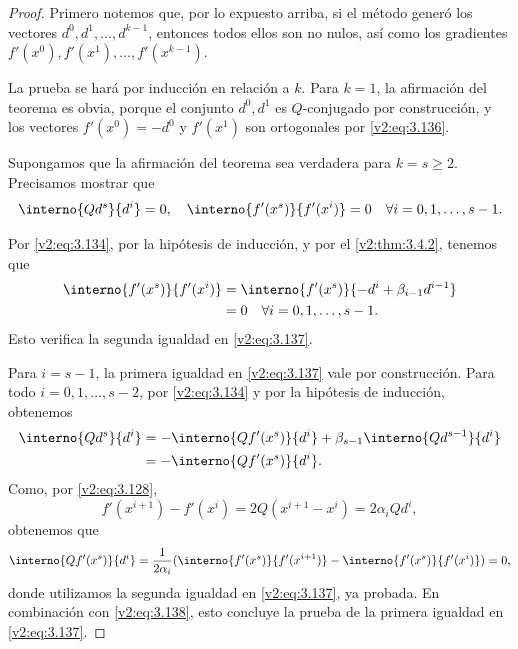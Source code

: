 \begin{proof}
    Primero notemos que, por lo expuesto arriba, si el método generó los vectores $d^0, d^1, \dots, d^{k-1}$, entonces todos ellos son no nulos, así como los gradientes $f'(x^0), f'(x^1), \dots, f'(x^{k-1})$.
    
    La prueba se hará por inducción en relación a $k$. Para $k=1$, la afirmación del teorema es obvia, porque el conjunto $d^0, d^1$ es $Q$-conjugado por construcción, y los vectores $f'(x^0) = -d^0$ y $f'(x^1)$ son ortogonales por \eqref{v2:eq:3.136}.
    
    Supongamos que la afirmación del teorema sea verdadera para $k = s \ge 2$. Precisamos mostrar que
    \begin{equation}
        \interno{Qd^s}{d^i} = 0, \quad \interno{f'(x^s)}{f'(x^i)} = 0 \quad \forall i = 0, 1, \dots, s-1.
        \label{v2:eq:3.137}
    \end{equation}
    
    Por \eqref{v2:eq:3.134}, por la hipótesis de inducción, y por el \cref{v2:thm:3.4.2}, tenemos que
    \begin{align*}
        \interno{f'(x^s)}{f'(x^i)} &= \interno{f'(x^s)}{-d^i + \beta_{i-1}d^{i-1}} \\
        &= 0 \quad \forall i = 0, 1, \dots, s-1.
    \end{align*}
    Esto verifica la segunda igualdad en \eqref{v2:eq:3.137}.
    
    Para $i = s-1$, la primera igualdad en \eqref{v2:eq:3.137} vale por construcción. Para todo $i = 0, 1, \dots, s-2$, por \eqref{v2:eq:3.134} y por la hipótesis de inducción, obtenemos
    \begin{align}
        \interno{Qd^s}{d^i} &= -\interno{Qf'(x^s)}{d^i} + \beta_{s-1}\interno{Qd^{s-1}}{d^i} \nonumber \\
        &= -\interno{Qf'(x^s)}{d^i}. \label{v2:eq:3.138}
    \end{align}
    Como, por \eqref{v2:eq:3.128},
    \[
        f'(x^{i+1}) - f'(x^i) = 2Q(x^{i+1} - x^i) = 2\alpha_i Qd^i,
    \]
    obtenemos que
    \[
        \interno{Qf'(x^s)}{d^i} = \frac{1}{2\alpha_i}(\interno{f'(x^s)}{f'(x^{i+1})} - \interno{f'(x^s)}{f'(x^i)}) = 0,
    \]
    donde utilizamos la segunda igualdad en \eqref{v2:eq:3.137}, ya probada. En combinación con \eqref{v2:eq:3.138}, esto concluye la prueba de la primera igualdad en \eqref{v2:eq:3.137}.
\end{proof}

